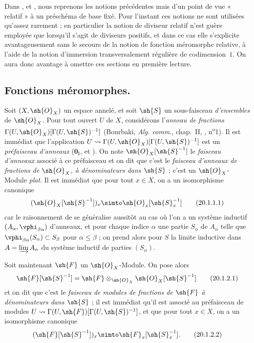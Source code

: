 Dans ,  et , nous reprenons les notions précédentes mais d'un point de vue « relatif » à un préschéma de base fixé.
Pour l'instant ces notions ne sont utilisées qu'assez rarement ; en particulier la notion de diviseur relatif n'est guère employée que lorsqu'il s'agit de diviseurs positifs, et dans ce cas elle s'explicite avantageusement sans le secours de la notion de fonction méromorphe relative, à l'aide de la notion d'immersion transversalement régulière de codimension~$1$.
On aura donc avantage à omettre ces sections en première lecture.

\subsection{Fonctions méromorphes.}

\begin{env}[20.1.1]
Soit $(X,\sh{O}_X)$ un espace annelé, et soit $\sh{S}$ un sous-faisceau \emph{d'ensembles} de $\sh{O}_X$.
Pour tout ouvert $U$ de $X$, considérons l'\emph{anneau de fractions} $\Gamma(U,\sh{O}_X)[\Gamma(U,\sh{S})^{-1}]$ (Bourbaki, \emph{Alg. comm.}, chap.~II, , n\textsuperscript{o}1).
Il est immédiat que l'application $U\leadsto\Gamma(U,\sh{O}_X)[\Gamma(U,\sh{S})^{-1}]$ est un \emph{préfaisceau d'anneaux} ($\mathbf{0}_{\mathrm I}$,  et ).
On note $\sh{O}_X[\sh{S}^{-1}]$ le \emph{faisceau d'anneaux} associé à ce préfaisceau et on dit que c'est le \emph{faisceau d'anneaux de fractions de $\sh{O}_X$, à dénominateurs dans $\sh{S}$} ; c'est un $\sh{O}_X$-Module \emph{plat}.
Il est immédiat que pour tout $x\in X$, on a un isomorphisme canonique
\[
\label{IV.20.1.1.1}
  (\sh{O}_X[\sh{S}^{-1}])_x\simto\sh{O}_x[\sh{S}_x^{-1}]
  \tag{20.1.1.1}
\]
car le raisonnement de  se généralise aussitôt au cas où l'on a un système inductif $(A_\alpha,\vphi_{\beta\alpha})$ d'anneaux, et pour chaque indice $\alpha$ une partie $S_\alpha$ de $A_\alpha$ telle que
$\vphi_{\beta\alpha}(S_\alpha)\subset S_\beta$ pour $\alpha\leq\beta$ ; on prend alors pour $S$ la limite inductive dans $A=\varinjlim A_\alpha$ du système inductif de parties $(S_\alpha)$.
\end{env}

\begin{env}[20.1.2]
Soit maintenant $\sh{F}$ un $\sh{O}_X$-Module.
On pose alors
\[
\label{IV.20.1.2.1}
  \sh{F}[\sh{S}^{-1}]=\sh{F}\otimes_{\sh{O}_X}\sh{O}_X[\sh{S}^{-1}]
  \tag{20.1.2.1}
\]
et on dit que c'est le \emph{faisceau de modules de fractions de $\sh{F}$ à dénominateurs dans $\sh{S}$} ; il est immédiat qu'il est associé au préfaisceau de modules $U\leadsto\Gamma(U,\sh{F})[\Gamma(U,\sh{S})^{-1}]$, et que pour tout $x\in X$, on a un isomorphisme canonique
\[
\label{IV.20.1.2.2}
  (\sh{F}[\sh{S}^{-1}])_x\simto\sh{F}_x[\sh{S}_x^{-1}].
  \tag{20.1.2.2}
\]
\end{env}

